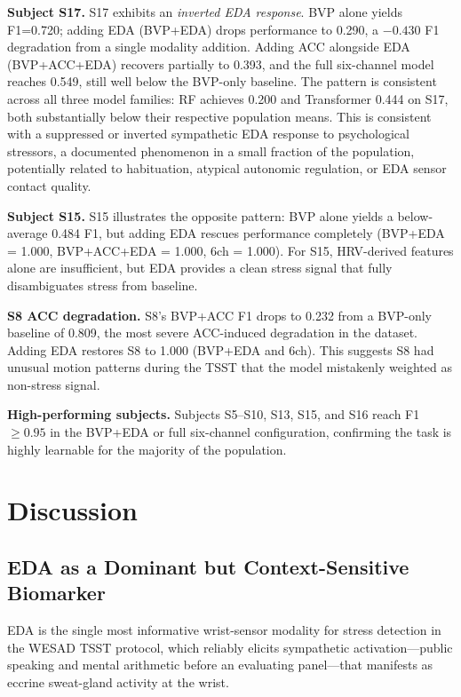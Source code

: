 \documentclass[10pt,twocolumn]{article}
\begin{document}
\textbf{Subject S17.} S17 exhibits an \emph{inverted EDA response}.
BVP alone yields F1=0.720; adding EDA (BVP+EDA) drops performance to
0.290, a $-0.430$ F1 degradation from a single modality addition.
Adding ACC alongside EDA (BVP+ACC+EDA) recovers partially to 0.393,
and the full six-channel model reaches 0.549, still well below the
BVP-only baseline. The pattern is consistent across all three model
families: RF achieves 0.200 and Transformer 0.444 on S17, both
substantially below their respective population means.
This is consistent with a suppressed or inverted sympathetic EDA response
to psychological stressors, a documented phenomenon in a small fraction
of the population, potentially related to habituation, atypical autonomic
regulation, or EDA sensor contact quality.

\textbf{Subject S15.} S15 illustrates the opposite pattern: BVP alone
yields a below-average 0.484 F1, but adding EDA rescues performance
completely (BVP+EDA = 1.000, BVP+ACC+EDA = 1.000, 6ch = 1.000).
For S15, HRV-derived features alone are insufficient, but EDA provides
a clean stress signal that fully disambiguates stress from baseline.

\textbf{S8 ACC degradation.} S8's BVP+ACC F1 drops to 0.232 from a
BVP-only baseline of 0.809, the most severe ACC-induced degradation
in the dataset. Adding EDA restores S8 to 1.000 (BVP+EDA and 6ch).
This suggests S8 had unusual motion patterns during the TSST that the
model mistakenly weighted as non-stress signal.

\textbf{High-performing subjects.} Subjects S5--S10, S13, S15, and S16
reach F1 $\geq 0.95$ in the BVP+EDA or full six-channel configuration,
confirming the task is highly learnable for the majority of the population.

\section{Discussion}
\label{sec:discussion}

\subsection{EDA as a Dominant but Context-Sensitive Biomarker}

EDA is the single most informative wrist-sensor modality for stress detection
in the WESAD TSST protocol, which reliably elicits sympathetic
activation---public speaking and mental arithmetic before an evaluating
panel---that manifests as eccrine sweat-gland activity at the wrist.
\end{document}
